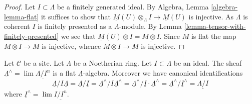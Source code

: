 \begin{proof}
Let $I \subset \Lambda$ be a finitely generated ideal.
By Algebra, Lemma \ref{algebra-lemma-flat} it suffices to show that
$\underline{M}(U) \otimes_\Lambda I \to \underline{M}(U)$
is injective. As $\Lambda$ is coherent $I$ is finitely presented as
a $\Lambda$-module. By Lemma \ref{lemma-tensor-with-finitely-presented}
we see that $\underline{M}(U) \otimes I = \underline{M \otimes I}$.
Since $M$ is flat the map $M \otimes I \to M$ is injective,
whence $\underline{M \otimes I} \to \underline{M}$ is injective.
\end{proof}

\begin{lemma}
\label{lemma-completion-flat}
Let $\mathcal{C}$ be a site. Let $\Lambda$ be a Noetherian ring.
Let $I \subset \Lambda$ be an ideal. The sheaf
$\underline{\Lambda}^\wedge = \lim \underline{\Lambda/I^n}$
is a flat $\underline{\Lambda}$-algebra.
Moreover we have canonical identifications
$$
\underline{\Lambda}/I\underline{\Lambda} =
\underline{\Lambda}/\underline{I} =
\underline{\Lambda}^\wedge/I\underline{\Lambda}^\wedge =
\underline{\Lambda}^\wedge/\underline{I} \cdot \underline{\Lambda}^\wedge =
\underline{\Lambda}^\wedge/\underline{I}^\wedge =
\underline{\Lambda/I}
$$
where $\underline{I}^\wedge = \lim \underline{I/I^n}$.
\end{lemma}

